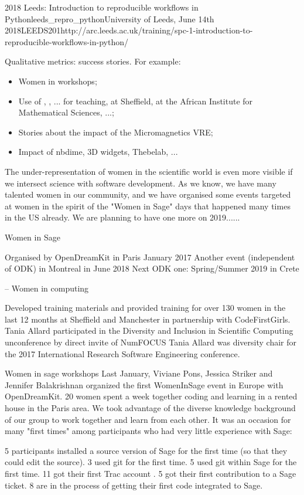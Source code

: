 \begin{Aim 1}
\begin{Aim 2}
\begin{event}{2018 Leeds: Introduction to reproducible workflows in Python}{leeds_repro_python}{University of Leeds, June 14th 
     2018}{LEEDS}{20}{1}{http://arc.leeds.ac.uk/training/spc-1-introduction-to-reproducible-workflows-in-python/}
\begin{itemize}
Qualitative metrics: success stories. For example:
\begin{itemize}
\item Women in \Sage workshops;
\item Use of \Jupyter, \cocalc, ... for teaching, at Sheffield, at the
  African Institute for Mathematical Sciences, ...;
\item Stories about the impact of the Micromagnetics VRE;
\item Impact of nbdime, 3D widgets, Thebelab, ...
\end{itemize}

  
 
 
 The under-representation of women in the scientific world is even more visible if we intersect science with software
  development. As we know, we have many talented women in our community, and we have organised some events targeted at women in the
  spirit of the "Women in Sage" days that happened many times in the US already. We are planning to have one more on 2019......

Women in Sage

    Organised by OpenDreamKit in Paris January 2017
    Another event (independent of ODK) in Montreal in June 2018
    Next ODK one: Spring/Summer 2019 in Crete

-- Women in computing

    Developed training materials and provided training for over 130 women in the last 12 months at Sheffield and Manchester in partnership with CodeFirstGirls.
    Tania Allard participated in the Diversity and Inclusion in Scientific Computing unconference by direct invite of NumFOCUS
    Tania Allard was diversity chair for the 2017 International Research Software Engineering conference.

 
 Women in sage workshops
 Last January, Viviane Pons, Jessica Striker and Jennifer Balakrishnan organized the first WomenInSage event in Europe with OpenDreamKit. 20 women spent a week together coding and learning in a rented house in the Paris area.
We took advantage of the diverse knowledge background of our group to work together and learn from each other. It was an occasion for many "first times" among participants who had very little experience with Sage:

    5 participants installed a source version of Sage for the first time (so that they could edit the source).
    3 used git for the first time.
    5 used git within Sage for the first time.
    11 got their first Trac account .
    5 got their first contribution to a Sage ticket.
    8 are in the process of getting their first code integrated to Sage.


\end{itemize}
\end{event}
\end{Aim 2}
\end{Aim 1}
